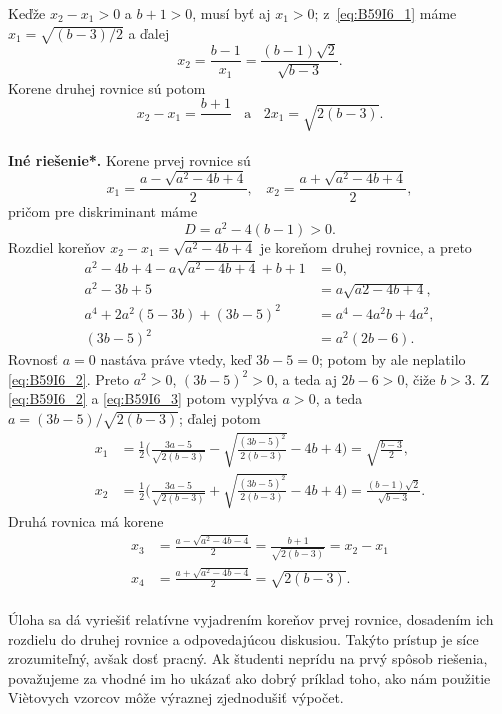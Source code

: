 {Keďže $x_2 - x_1 > 0$ a $b + 1 > 0$, musí byť aj $x_1 > 0$; z~\ref{eq:B59I6_1} máme $x_1 =\sqrt{(b - 3)/2}$ a ďalej
$$x_2 =\frac{b-1}{x_1}=\frac{(b - 1)\sqrt{2}}{\sqrt{b-3}}.$$
Korene druhej rovnice sú potom
$$x_2 - x_1 = \frac{b+1}{} \ \ \ \ \text{a} \ \ \ \  2x_1=\sqrt{2(b - 3)}.$$
\\
\textbf{Iné riešenie*.} Korene prvej rovnice sú
$$x_1 = \frac{a -\sqrt{a^2 - 4b + 4}}{2}, \ \ \ \  x_2 =\frac{a +\sqrt{a^2 - 4b + 4}}{2},$$
pričom pre diskriminant máme
\begin{equation} \label{eq:B59I6_2}
    D = a^2 - 4(b - 1) > 0.
\end{equation}
Rozdiel koreňov $x_2 - x_1 =\sqrt{a^2 - 4b + 4}$ je koreňom druhej rovnice, a preto
\begin{equation} \label{eq:B59I6_3}
    \begin{aligned}
        a^2 - 4b + 4 - a \sqrt{a^2 - 4b + 4} + b + 1 &= 0,\\
a^2 - 3b + 5 &= a\sqrt{a 2 - 4b + 4},\\
a^4 + 2a^2 (5 - 3b) + (3b - 5)^2 &= a^4 - 4a^2 b + 4a^2,\\
(3b - 5)^2 &= a^2 (2b - 6).
    \end{aligned}
\end{equation}
Rovnosť  $a = 0$ nastáva práve vtedy, keď $3b - 5 = 0$; potom by ale neplatilo \ref{eq:B59I6_2}. Preto $a^2 > 0$, $(3b - 5)^2 > 0$, a teda aj $2b - 6 > 0$, čiže $b > 3$. Z \ref{eq:B59I6_2} a \ref{eq:B59I6_3} potom vyplýva $a > 0$, a teda $a = (3b - 5)/\sqrt{2(b - 3)}$; ďalej potom
\begin{align*}
x_1 &=\frac{1}{2}\bigg( \frac{3a-5}{\sqrt{2(b-3)}}-\sqrt{\frac{(3b-5)^2}{2(b-3)}}-4b+4\bigg)=\sqrt{\frac{b-3}{2}},\\
x_2 &=\frac{1}{2} \bigg( \frac{3a-5}{\sqrt{2(b-3)}}+\sqrt{\frac{(3b-5)^2}{2(b-3)}}-4b+4\bigg)=\frac{(b-1)\sqrt{2}}{\sqrt{b-3}}.
\end{align*}
Druhá rovnica má korene
\begin{align*}
x_3 &=\frac{a-\sqrt{a^2-4b-4}}{2}=\frac{b+1}{\sqrt{2(b-3)}}=x_2-x_1\\
x_4 &=\frac{a+\sqrt{a^2-4b-4}}{2}=\sqrt{2(b-3)}.
\end{align*}
\\
\kom Úloha sa dá vyriešiť relatívne  vyjadrením koreňov prvej rovnice, dosadením ich rozdielu do druhej rovnice a odpovedajúcou diskusiou. Takýto prístup je síce zrozumiteľný, avšak dosť pracný. Ak študenti neprídu na prvý spôsob riešenia, považujeme za vhodné im ho ukázať ako dobrý príklad toho, ako nám použitie Viètovych vzorcov môže výraznej zjednodušiť výpočet.\\
\\
}
